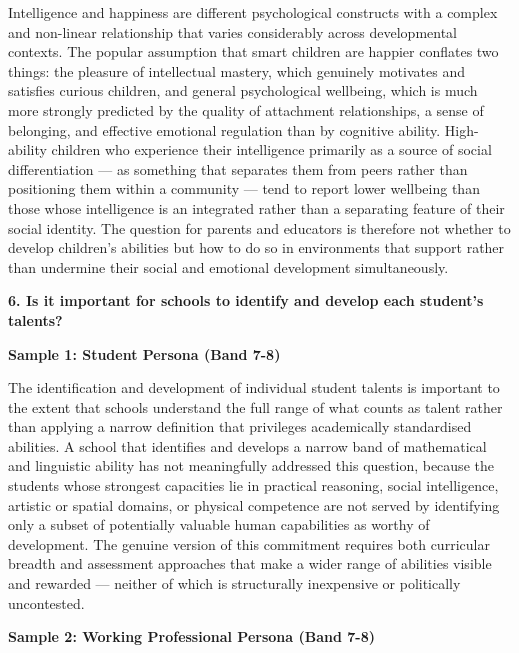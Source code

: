 Intelligence and happiness are different psychological constructs with a complex and non-linear relationship that varies considerably across developmental contexts. The popular assumption that smart children are happier conflates two things: the pleasure of intellectual mastery, which genuinely motivates and satisfies curious children, and general psychological wellbeing, which is much more strongly predicted by the quality of attachment relationships, a sense of belonging, and effective emotional regulation than by cognitive ability. High-ability children who experience their intelligence primarily as a source of social differentiation — as something that separates them from peers rather than positioning them within a community — tend to report lower wellbeing than those whose intelligence is an integrated rather than a separating feature of their social identity. The question for parents and educators is therefore not whether to develop children's abilities but how to do so in environments that support rather than undermine their social and emotional development simultaneously.

\separator

\begin{ieltsquestion}
\textbf{6. Is it important for schools to identify and develop each student's talents?}
\end{ieltsquestion}
\textbf{Sample 1: Student Persona (Band 7-8)}

The identification and development of individual student talents is important to the extent that schools understand the full range of what counts as talent rather than applying a narrow definition that privileges academically standardised abilities. A school that identifies and develops a narrow band of mathematical and linguistic ability has not meaningfully addressed this question, because the students whose strongest capacities lie in practical reasoning, social intelligence, artistic or spatial domains, or physical competence are not served by identifying only a subset of potentially valuable human capabilities as worthy of development. The genuine version of this commitment requires both curricular breadth and assessment approaches that make a wider range of abilities visible and rewarded — neither of which is structurally inexpensive or politically uncontested.

\textbf{Sample 2: Working Professional Persona (Band 7-8)}

